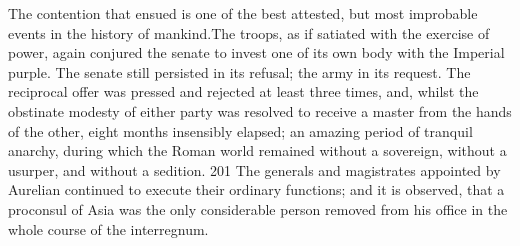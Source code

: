 
The contention that ensued is one of the best attested, but most
improbable events in the history of mankind.\footnotemark[2] The troops, as if
satiated with the exercise of power, again conjured the senate to
invest one of its own body with the Imperial purple. The senate
still persisted in its refusal; the army in its request. The
reciprocal offer was pressed and rejected at least three times,
and, whilst the obstinate modesty of either party was resolved to
receive a master from the hands of the other, eight months
insensibly elapsed; an amazing period of tranquil anarchy, during
which the Roman world remained without a sovereign, without a
usurper, and without a sedition. 201 The generals and magistrates
appointed by Aurelian continued to execute their ordinary
functions; and it is observed, that a proconsul of Asia was the
only considerable person removed from his office in the whole
course of the interregnum.



